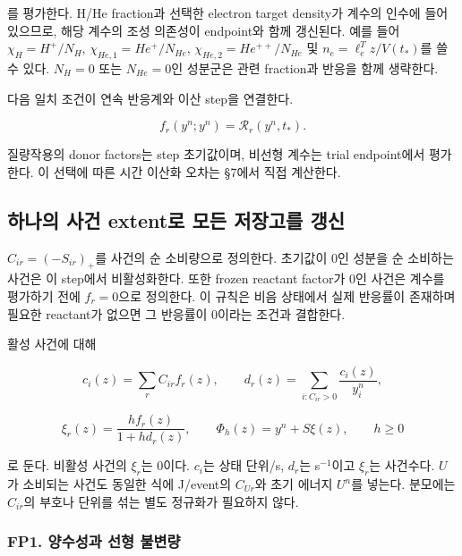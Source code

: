 \documentclass[11pt,a4paper]{article}
\begin{document}
를 평가한다. H/He fraction과 선택한 electron target density가 계수의 인수에 들어 있으므로, 해당 계수의 조성 의존성이 endpoint와 함께 갱신된다. 예를 들어 \(\chi_H=H^+/N_H\), \(\chi_{He,1}=He^+/N_{He}\), \(\chi_{He,2}=He^{++}/N_{He}\) 및 \(n_e=\ell_e^Tz/V(t_*)\)를 쓸 수 있다. \(N_H=0\) 또는 \(N_{He}=0\)인 성분군은 관련 fraction과 반응을 함께 생략한다.

다음 일치 조건이 연속 반응계와 이산 step을 연결한다.

\[
\boxed{f_r(y^n;y^n)=\mathcal R_r(y^n,t_*).}
\tag{FP.6}
\]

질량작용의 donor factors는 step 초기값이며, 비선형 계수는 trial endpoint에서 평가한다. 이 선택에 따른 시간 이산화 오차는 §7에서 직접 계산한다.

\hypertarget{uxd558uxb098uxc758-uxc0acuxac74-extentuxb85c-uxbaa8uxb4e0-uxc800uxc7a5uxace0uxb97c-uxac31uxc2e0}{%
\subsection{하나의 사건 extent로 모든 저장고를 갱신}\label{uxd558uxb098uxc758-uxc0acuxac74-extentuxb85c-uxbaa8uxb4e0-uxc800uxc7a5uxace0uxb97c-uxac31uxc2e0}}

\(C_{ir}=(-S_{ir})_+\)를 사건의 순 소비량으로 정의한다. 초기값이 0인 성분을 순 소비하는 사건은 이 step에서 비활성화한다. 또한 frozen reactant factor가 0인 사건은 계수를 평가하기 전에 \(f_r=0\)으로 정의한다. 이 규칙은 비음 상태에서 실제 반응률이 존재하며 필요한 reactant가 없으면 그 반응률이 0이라는 조건과 결합한다.

활성 사건에 대해

\[
c_i(z)=\sum_r C_{ir}f_r(z),\qquad
d_r(z)=\sum_{i:C_{ir}>0}\frac{c_i(z)}{y_i^n},
\tag{FP.7}
\]

\[
\xi_r(z)=\frac{h f_r(z)}{1+h d_r(z)},\qquad
\boxed{\Phi_h(z)=y^n+S\xi(z)},\qquad h\ge0
\tag{FP.8}
\]

로 둔다. 비활성 사건의 \(\xi_r\)는 0이다. \(c_i\)는 상태 단위/s, \(d_r\)는 s\(^{-1}\)이고 \(\xi_r\)는 사건수다. \(U\)가 소비되는 사건도 동일한 식에 J/event의 \(C_{Ur}\)와 초기 에너지 \(U^n\)를 넣는다. 분모에는 \(C_{ir}\)의 부호나 단위를 섞는 별도 정규화가 필요하지 않다.

\hypertarget{fp1.-uxc591uxc218uxc131uxacfc-uxc120uxd615-uxbd88uxbcc0uxb7c9}{%
\subsubsection{FP1. 양수성과 선형 불변량}\label{fp1.-uxc591uxc218uxc131uxacfc-uxc120uxd615-uxbd88uxbcc0uxb7c9}}
\end{document}
